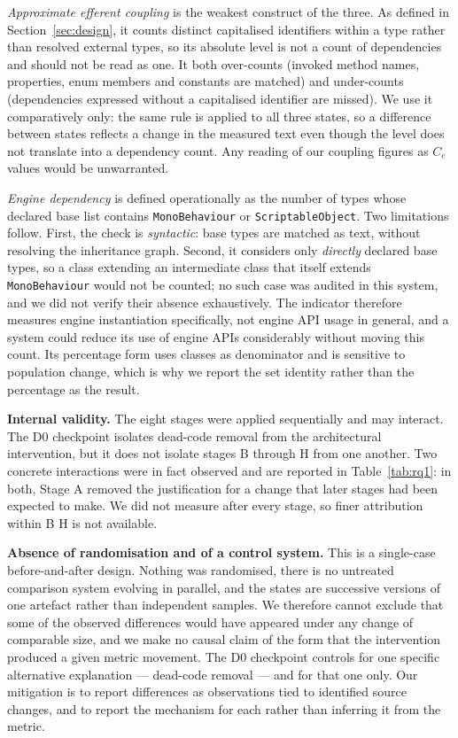 \documentclass[pdflatex,sn-basic]{sn-jnl}
\begin{document}
\emph{Approximate efferent coupling} is the weakest construct of the three. As defined in Section~\ref{sec:design}, it counts distinct capitalised identifiers within a type rather than resolved external types, so its absolute level is not a count of dependencies and should not be read as one. It both over-counts (invoked method names, properties, enum members and constants are matched) and under-counts (dependencies expressed without a capitalised identifier are missed). We use it comparatively only: the same rule is applied to all three states, so a difference between states reflects a change in the measured text even though the level does not translate into a dependency count. Any reading of our coupling figures as $C_e$ values would be unwarranted.

\emph{Engine dependency} is defined operationally as the number of types whose declared base list contains \texttt{MonoBehaviour} or \texttt{ScriptableObject}. Two limitations follow. First, the check is \emph{syntactic}: base types are matched as text, without resolving the inheritance graph. Second, it considers only \emph{directly} declared base types, so a class extending an intermediate class that itself extends \texttt{MonoBehaviour} would not be counted; no such case was audited in this system, and we did not verify their absence exhaustively. The indicator therefore measures engine instantiation specifically, not engine API usage in general, and a system could reduce its use of engine APIs considerably without moving this count. Its percentage form uses classes as denominator and is sensitive to population change, which is why we report the set identity rather than the percentage as the result.

\medskip\noindent\textbf{Internal validity.} The eight stages were applied sequentially and may interact. The D0 checkpoint isolates dead-code removal from the architectural intervention, but it does not isolate stages B through H from one another. Two concrete interactions were in fact observed and are reported in Table~\ref{tab:rq1}: in both, Stage A removed the justification for a change that later stages had been expected to make. We did not measure after every stage, so finer attribution within B\textendash{} H is not available.

\medskip\noindent\textbf{Absence of randomisation and of a control system.} This is a single-case before-and-after design. Nothing was randomised, there is no untreated comparison system evolving in parallel, and the states are successive versions of one artefact rather than independent samples. We therefore cannot exclude that some of the observed differences would have appeared under any change of comparable size, and we make no causal claim of the form that the intervention produced a given metric movement. The D0 checkpoint controls for one specific alternative explanation --- dead-code removal --- and for that one only. Our mitigation is to report differences as observations tied to identified source changes, and to report the mechanism for each rather than inferring it from the metric.
\end{document}
